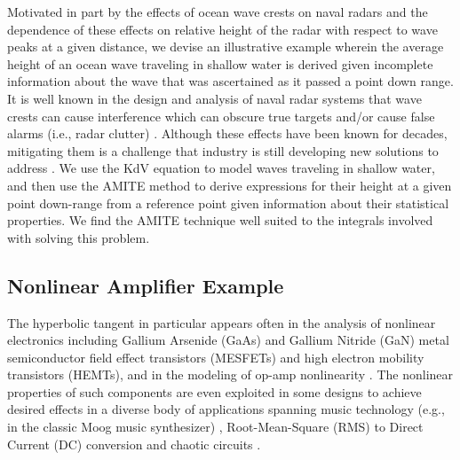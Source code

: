Motivated in part by the effects of ocean wave crests on naval radars and
the dependence of these effects on relative height of the radar with respect
to wave peaks at a given distance, we devise an illustrative example wherein
the average height of an ocean wave traveling in shallow water is derived given
incomplete information about the wave that was ascertained as it passed a point
down range.  It is well known in the design and analysis of naval radar
systems that wave crests can cause interference which can obscure true targets
and/or cause false alarms (i.e., radar clutter) \cite{barton_modern_1988,friedman_naval_1981,skolnik_radar_2008}.  Although
these effects have been known for decades, mitigating them is a
challenge that industry is still developing new solutions to address
\cite{fuchs_method_2018,lapat_high_2019,noauthor_quantile_2020}.
We use the KdV equation to model waves traveling in shallow water, and then
use the AMITE method to derive expressions for their height at a given
point down-range from a reference point given
information about their statistical properties.  We find the AMITE technique
well suited to the integrals involved with solving this problem.

\subsection{Nonlinear Amplifier Example}
The hyperbolic tangent in particular appears often in the analysis of nonlinear electronics including Gallium Arsenide (GaAs) \cite{angelov_new_1992, mccamant_improved_1990, zhu_nonlinear_2005} and Gallium Nitride (GaN) \cite{bakhvalova_determination_2010, cabral_nonlinear_2004, otsuka_semi-physical_2011} metal semiconductor field effect transistors (MESFETs) and high electron mobility transistors (HEMTs), and in the modeling of op-amp nonlinearity \cite{abdelfattah_modeling_2006}.  The nonlinear properties of such components are even exploited in some designs to achieve desired effects in a diverse body of applications spanning music technology (e.g., in the classic Moog music synthesizer)
\cite{moog_voltage-controlled_1965, moog_electronic_1969},
Root-Mean-Square (RMS) to Direct Current (DC) conversion \cite{gilbert_rms_dc_2000} and chaotic circuits \cite{ketthong_simple_2017}. 

